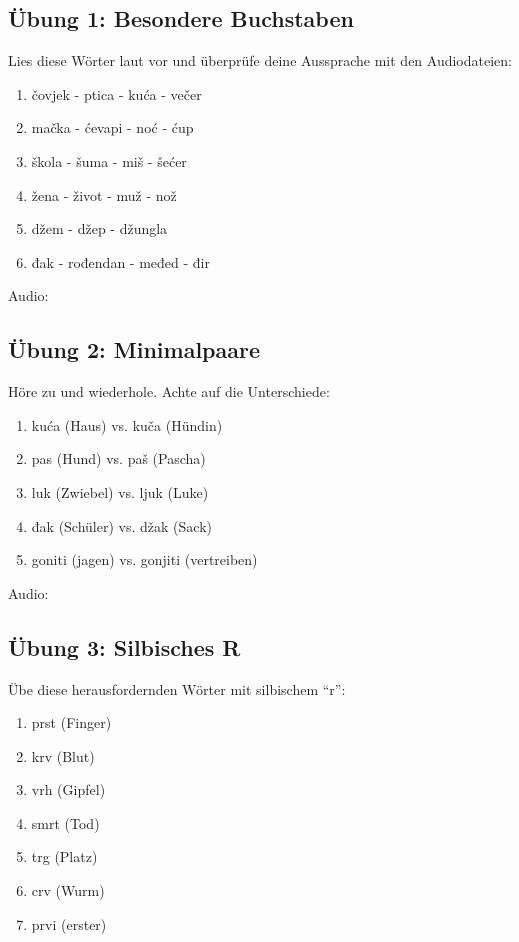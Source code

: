 \subsection{Übung 1: Besondere Buchstaben}

Lies diese Wörter laut vor und überprüfe deine Aussprache mit den Audiodateien:

\begin{enumerate}
    \item čovjek - ptica - kuća - večer
    \item mačka - ćevapi - noć - ćup
    \item škola - šuma - miš - šećer
    \item žena - život - muž - nož
    \item džem - džep - džungla
    \item đak - rođendan - međed - đir
\end{enumerate}

Audio: 

\subsection{Übung 2: Minimalpaare}

Höre zu und wiederhole. Achte auf die Unterschiede:

\begin{enumerate}
    \item kuća (Haus) vs. kuča (Hündin)
    \item pas (Hund) vs. paš (Pascha)
    \item luk (Zwiebel) vs. ljuk (Luke)
    \item đak (Schüler) vs. džak (Sack)
    \item goniti (jagen) vs. gonjiti (vertreiben)
\end{enumerate}

Audio: 

\subsection{Übung 3: Silbisches R}

Übe diese herausfordernden Wörter mit silbischem ``r'':

\begin{enumerate}
    \item prst (Finger)
    \item krv (Blut)
    \item vrh (Gipfel)
    \item smrt (Tod)
    \item trg (Platz)
    \item crv (Wurm)
    \item prvi (erster)
\end{enumerate}

